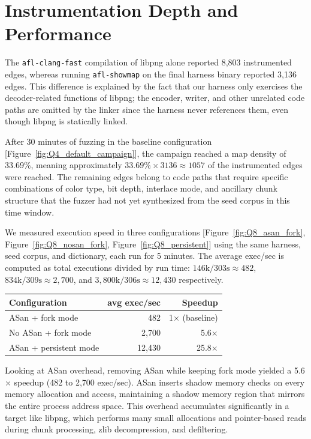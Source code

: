 \section{Instrumentation Depth and Performance}
The \texttt{afl-clang-fast} compilation of libpng alone reported
8{,}803 instrumented edges, whereas running \texttt{afl-showmap} on
the final harness binary reported 3{,}136 edges. This difference is
explained by the fact that our harness only exercises the
decoder-related functions of libpng; the encoder, writer, and other
unrelated code paths are omitted by the linker since the harness
never references them, even though libpng is statically linked.

After 30 minutes of fuzzing in the baseline configuration
[Figure~\ref{fig:Q4_default_campaign}], the campaign reached a map density
of 33.69\%, meaning approximately
$33.69\% \times 3136 \approx 1057$ of the instrumented edges were
reached. The remaining edges belong to code paths that require
specific combinations of color type, bit depth, interlace mode, and
ancillary chunk structure that the fuzzer had not yet synthesized
from the seed corpus in this time window.

We measured execution speed in three configurations
[Figure~\ref{fig:Q8_asan_fork}, Figure~\ref{fig:Q8_nosan_fork},
Figure~\ref{fig:Q8_persistent}] using the same harness, seed corpus,
and dictionary, each run for 5 minutes. The average exec/sec is
computed as total executions divided by run time:
$146\text{k}/303\text{s} \approx 482$,
$834\text{k}/309\text{s} \approx 2{,}700$, and
$3{,}800\text{k}/306\text{s} \approx 12{,}430$ respectively.

\begin{center}
\begin{tabular}{lrr}
\hline
\textbf{Configuration} & \textbf{avg exec/sec} & \textbf{Speedup} \\
\hline
ASan + fork mode       & 482      & 1$\times$ (baseline) \\
No ASan + fork mode    & 2{,}700  & 5.6$\times$          \\
ASan + persistent mode & 12{,}430 & 25.8$\times$         \\
\hline
\end{tabular}
\end{center}

Looking at ASan overhead, removing ASan while keeping fork mode yielded a
5.6$\times$ speedup (482 to 2{,}700 exec/sec). ASan inserts shadow
memory checks on every memory allocation and access, maintaining a
shadow memory region that mirrors the entire process address space.
This overhead accumulates significantly in a target like libpng, which performs many small allocations and
pointer-based reads during chunk processing, zlib decompression, and defiltering.

